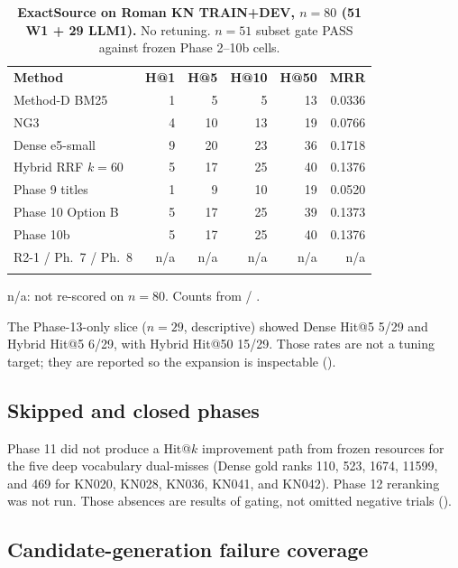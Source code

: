 \documentclass[10pt,letterpaper]{article}
\newlength\savedwidth
\newcommand\thickhline{\noalign{\global\savedwidth\arrayrulewidth\global\arrayrulewidth 2pt}%
\hline
\noalign{\global\arrayrulewidth\savedwidth}}
\begin{document}
\begin{table}[!ht]
\centering
\caption{\textbf{ExactSource on Roman KN TRAIN+DEV, $n = 80$ (51 W1 + 29 LLM1).} No retuning. $n = 51$ subset gate PASS against frozen Phase 2--10b cells.}
\label{table3}
\begin{tabular}{lrrrrr}
\thickhline
\textbf{Method} & \textbf{H@1} & \textbf{H@5} & \textbf{H@10} & \textbf{H@50} & \textbf{MRR} \\
\thickhline
Method-D BM25 & 1 & 5 & 5 & 13 & 0.0336 \\
NG3 & 4 & 10 & 13 & 19 & 0.0766 \\
Dense e5-small & 9 & 20 & 23 & 36 & 0.1718 \\
Hybrid RRF $k{=}60$ & 5 & 17 & 25 & 40 & 0.1376 \\
Phase 9 titles & 1 & 9 & 10 & 19 & 0.0520 \\
Phase 10 Option B & 5 & 17 & 25 & 39 & 0.1373 \\
Phase 10b & 5 & 17 & 25 & 40 & 0.1376 \\
R2-1 / Ph.~7 / Ph.~8 & n/a & n/a & n/a & n/a & n/a \\
\thickhline
\end{tabular}
\begin{flushleft} n/a: not re-scored on $n = 80$. Counts from  / .
\end{flushleft}
\end{table}

The Phase-13-only slice ($n = 29$, descriptive) showed Dense Hit@5 5/29 and Hybrid Hit@5 6/29, with Hybrid Hit@50 15/29. Those rates are not a tuning target; they are reported so the expansion is inspectable ().

\subsection*{Skipped and closed phases}

Phase 11 did not produce a Hit@$k$ improvement path from frozen resources for the five deep vocabulary dual-misses (Dense gold ranks 110, 523, 1674, 11599, and 469 for KN020, KN028, KN036, KN041, and KN042). Phase 12 reranking was not run. Those absences are results of gating, not omitted negative trials ().

\subsection*{Candidate-generation failure coverage}
\end{document}
